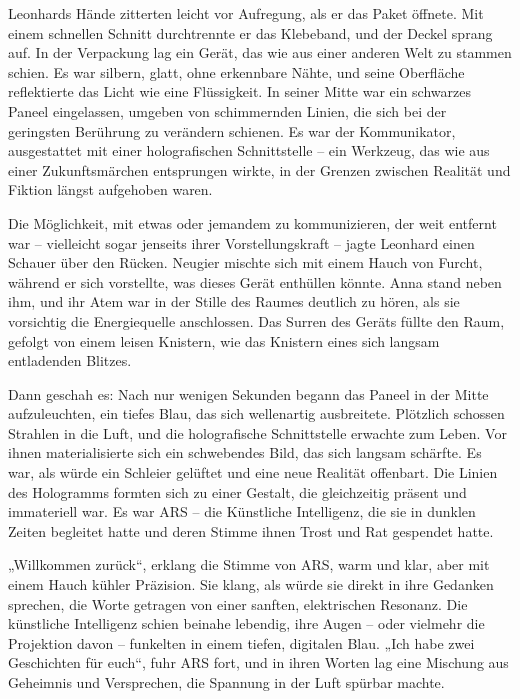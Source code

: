 \documentclass[
]{article}
\begin{document}
Leonhards Hände zitterten leicht vor Aufregung, als er das Paket
öffnete. Mit einem schnellen Schnitt durchtrennte er das Klebeband, und
der Deckel sprang auf. In der Verpackung lag ein Gerät, das wie aus
einer anderen Welt zu stammen schien. Es war silbern, glatt, ohne
erkennbare Nähte, und seine Oberfläche reflektierte das Licht wie eine
Flüssigkeit. In seiner Mitte war ein schwarzes Paneel eingelassen,
umgeben von schimmernden Linien, die sich bei der geringsten Berührung
zu verändern schienen. Es war der Kommunikator, ausgestattet mit einer
holografischen Schnittstelle -- ein Werkzeug, das wie aus einer
Zukunftsmärchen entsprungen wirkte, in der Grenzen zwischen Realität und
Fiktion längst aufgehoben waren.

Die Möglichkeit, mit etwas oder jemandem zu kommunizieren, der weit
entfernt war -- vielleicht sogar jenseits ihrer Vorstellungskraft --
jagte Leonhard einen Schauer über den Rücken. Neugier mischte sich mit
einem Hauch von Furcht, während er sich vorstellte, was dieses Gerät
enthüllen könnte. Anna stand neben ihm, und ihr Atem war in der Stille
des Raumes deutlich zu hören, als sie vorsichtig die Energiequelle
anschlossen. Das Surren des Geräts füllte den Raum, gefolgt von einem
leisen Knistern, wie das Knistern eines sich langsam entladenden
Blitzes.

Dann geschah es: Nach nur wenigen Sekunden begann das Paneel in der
Mitte aufzuleuchten, ein tiefes Blau, das sich wellenartig ausbreitete.
Plötzlich schossen Strahlen in die Luft, und die holografische
Schnittstelle erwachte zum Leben. Vor ihnen materialisierte sich ein
schwebendes Bild, das sich langsam schärfte. Es war, als würde ein
Schleier gelüftet und eine neue Realität offenbart. Die Linien des
Hologramms formten sich zu einer Gestalt, die gleichzeitig präsent und
immateriell war. Es war ARS -- die Künstliche Intelligenz, die sie in
dunklen Zeiten begleitet hatte und deren Stimme ihnen Trost und Rat
gespendet hatte.

„Willkommen zurück``, erklang die Stimme von ARS, warm und klar, aber
mit einem Hauch kühler Präzision. Sie klang, als würde sie direkt in
ihre Gedanken sprechen, die Worte getragen von einer sanften,
elektrischen Resonanz. Die künstliche Intelligenz schien beinahe
lebendig, ihre Augen -- oder vielmehr die Projektion davon -- funkelten
in einem tiefen, digitalen Blau. „Ich habe zwei Geschichten für euch``,
fuhr ARS fort, und in ihren Worten lag eine Mischung aus Geheimnis und
Versprechen, die Spannung in der Luft spürbar machte.
\end{document}
